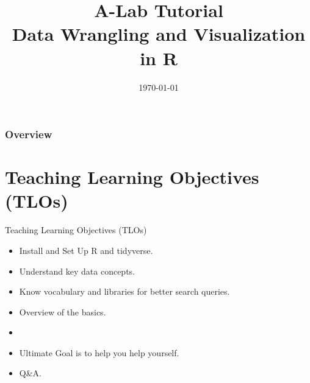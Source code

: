 \documentclass[12pt,aspectratio=169]{beamer}
\title[A-Lab]{A-Lab Tutorial \\ Data Wrangling and Visualization in R} %
\author{} %
\institute[] %
{
Sebastian Steffen \\ %
\medskip
\textit{ssteffen@mit.edu} %
}
\date{\today} %
\begin{document}
\begin{frame}
\titlepage %
\end{frame}

\begin{frame}
\frametitle{Overview} %
\tableofcontents %
\end{frame}



\section{Teaching Learning Objectives (TLOs)}
\begin{frame}{Teaching Learning Objectives (TLOs)}
\begin{itemize}
    \item<1-> Install and Set Up R and tidyverse.
    \item<2-> Understand key data concepts. 
    \item<3-> Know vocabulary and libraries for better search queries.
    \item<4-> Overview of the basics.
    \item<5->[]
    \item<5-> Ultimate Goal is to help you help yourself.
    \item<6-> Q\&A.
\end{itemize}
\end{frame}
\end{document}
